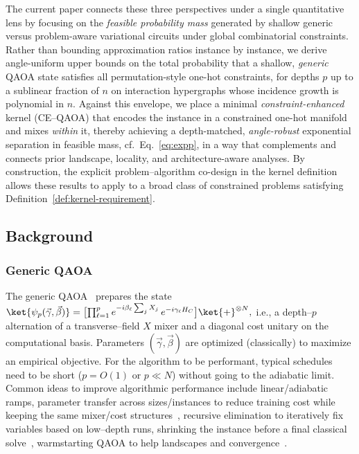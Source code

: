 \documentclass[a4paper,onecolumn,11pt,unpublished]{quantumarticle}
\theoremstyle{remark}
\begin{document}
The current paper connects these three perspectives under a single quantitative
lens by focusing on the \emph{feasible probability mass} generated by shallow
generic versus problem-aware variational circuits under global combinatorial
constraints. Rather than bounding approximation ratios instance by instance,
we derive angle-uniform upper bounds on the total probability that a shallow,
\emph{generic} QAOA state satisfies all permutation-style one-hot constraints, for depths $p$ up to a sublinear fraction of $n$ on interaction hypergraphs whose incidence growth is polynomial in $n$. Against this envelope, we place a minimal \emph{constraint-enhanced} kernel (CE--QAOA) that encodes the instance in a constrained one-hot manifold and mixes \emph{within} it, thereby achieving a
depth-matched, \emph{angle-robust} exponential separation in feasible mass,
cf.\ Eq.~\eqref{eq:expp}, in a way that complements and connects prior
landscape, locality, and architecture-aware analyses. By construction, the
explicit problem–algorithm co-design in the kernel definition allows these
results to apply to a broad class of constrained problems satisfying
Definition~\ref{def:kernel-requirement}.





\subsection{Background}
\label{sec:back}

\subsubsection{Generic QAOA}
\label{subsec:generic-qaoa}
The generic QAOA~\cite{Farhi2014QAOA} prepares the state
\(
\ket{\psi_p(\vec\gamma,\vec\beta)}
=\bigl[\prod_{\ell=1}^{p}e^{-i\beta_\ell \sum_j X_j}\,e^{-i\gamma_\ell H_C}\bigr]\ket{+}^{\otimes N},
\)
i.e., a depth–$p$ alternation of a transverse–field $X$ mixer and a diagonal cost unitary on the computational basis. Parameters \((\vec\gamma,\vec\beta)\) are optimized (classically) to maximize an empirical objective. For the algorithm to be performant,  typical schedules need to be short (\(p=O(1)\) or \(p\ll N\)) without going to the adiabatic limit\cite{Lucas2014}. Common ideas to improve algorithmic performance include linear/adiabatic ramps\cite{montanezbarrera2024universalqaoa}, parameter transfer across sizes/instances to reduce training cost while keeping the same mixer/cost structures~\cite{Monta_ez_Barrera_2025T}, recursive elimination to iteratively fix variables based on low–depth runs, shrinking the instance before a final classical solve~\cite{Bravyi_2020, BaeLee2024RecursiveQAOA},  warmstarting QAOA to help landscapes and convergence~\cite{Egger2021Warm, carmo2025warmstarting}. 
\end{document}
